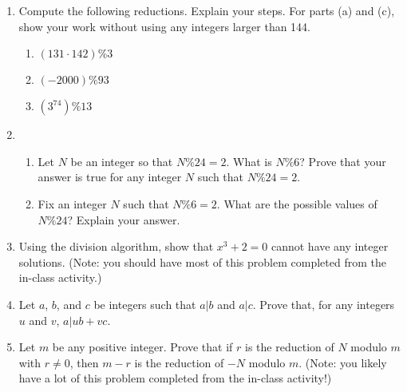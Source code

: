 \documentclass[12pt]{article}
\begin{document}
\begin{enumerate}
\item Compute the following reductions.  Explain your steps.  For parts (a) and (c), show your work without using any integers larger than 144. 
\begin{enumerate}

\item $(131\cdot 142) \% 3$ \\
\item $(-2000) \% 93$\\
\item $\left(3^{74}\right) \% 13$ 
\end{enumerate}
\item
\begin{enumerate}
\item  Let $N$ be an integer so that $N\%24 = 2$.  What is $N\%6$?  Prove that your answer is true for any integer $N$ such that $N\%24=2$.
\item Fix an integer $N$ such that $N\%6=2$. What are the possible values of $N\%24$? Explain your answer. 
\end{enumerate}

\item Using the division algorithm, show that $x^3+2=0$ cannot have any integer solutions. (Note: you should have most of this problem completed from the in-class activity.)

\item Let $a$, $b$, and $c$ be integers such that $a|b$ and $a|c$. Prove that,  for any integers $u$ and $v$, $a|ub+vc$. 
\item Let $m$ be any positive integer. Prove that  if $r$ is the reduction of $N$ modulo $m$ with $r\ne 0$, then $m-r$ is the reduction of $-N$ modulo $m$.  (Note: you likely have a lot of this problem completed from the in-class activity!)


\end{enumerate}
\end{document}
